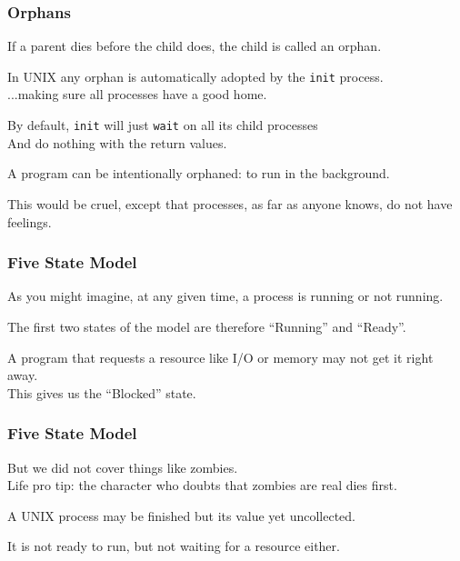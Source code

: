 \begin{frame}
	\frametitle{Orphans}

	If a parent dies before the child does, the child is called an \alert{orphan}.

	In UNIX any orphan is automatically adopted by the \texttt{init} process.\\
	\quad ...making sure all processes have a good home.

	By default, \texttt{init} will just \texttt{wait} on all its child processes\\
	\quad And do nothing with the return values.

	A program can be intentionally orphaned: to run in the background.


	This would be cruel, except that processes, as far as anyone knows, do not have feelings.


\end{frame}


\begin{frame}
	\frametitle{Five State Model}

	As you might imagine, at any given time, a process is running or not running.

	The first two states of the model are therefore ``Running'' and ``Ready''.

	A program that requests a resource like I/O or memory may not get it right away.\\
	\quad This gives us the ``Blocked'' state.

\end{frame}


\begin{frame}
	\frametitle{Five State Model}

	But we did not cover things like zombies.\\
	\quad Life pro tip: the character who doubts that zombies are real dies first.

	A UNIX process may be finished but its value yet uncollected.

	It is not ready to run, but not waiting for a resource either.

\end{frame}


